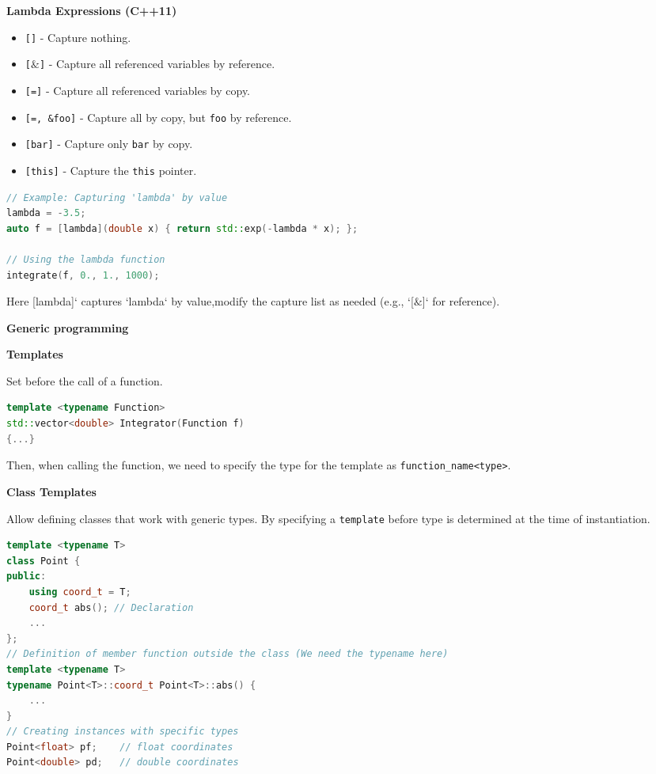 \documentclass[fontsize=8pt, a4paper, landscape, fleqn]{scrartcl}
\renewcommand{\section}[1]{%
    \noindent\colorbox{sectioncolor}{%
        \parbox{\dimexpr\columnwidth-2\fboxsep}{\color{white}\textbf{#1}}}%
    \vspace{0.5mm}%
}
\renewcommand{\subsection}[1]{%
    \noindent\colorbox{subsectioncolor}{%
        \parbox{\dimexpr\columnwidth-2\fboxsep}{\color{white}\textbf{#1}}}%
    \vspace{0.5mm}%
}
\begin{document}
\begin{multicols*}{3}[\raggedcolumns]
\subsection{Lambda Expressions (C++11)}
\begin{itemize}
    \item \texttt{[]} - Capture nothing.
    \item \texttt{[$\&$]} - Capture all referenced variables by reference.
    \item \texttt{[=]} - Capture all referenced variables by copy.
    \item \texttt{[=, \&foo]} - Capture all by copy, but \texttt{foo} by reference.
    \item \texttt{[bar]} - Capture only \texttt{bar} by copy.
    \item \texttt{[this]} - Capture the \texttt{this} pointer.
\end{itemize}

\begin{lstlisting}[language=C++, breaklines, emph={operator}, emphstyle={\color{red}}]
// Example: Capturing 'lambda' by value
lambda = -3.5;
auto f = [lambda](double x) { return std::exp(-lambda * x); };

// Using the lambda function
integrate(f, 0., 1., 1000);
\end{lstlisting}
Here [lambda]` captures `lambda` by value,modify the capture list as needed (e.g., `[$\&$]` for reference).
    \section{Generic programming}
    \subsection{Templates} 
    Set before the call of a function.

    \begin{lstlisting}[language=C++, breaklines, emph={template, Function}, emphstyle={\color{red}}]
template <typename Function>
std::vector<double> Integrator(Function f)
{...}\end{lstlisting}


    Then, when calling the function, we need to specify the type for the template as \lstinline{function_name<type>}.

    \subsection{Class Templates} 
Allow defining classes that work with generic types. By specifying a \texttt{template} before type is determined at the time of instantiation. 
\begin{lstlisting}[language=C++, breaklines, emph={T}, emphstyle={\color{red}}]
template <typename T>
class Point {
public:
    using coord_t = T;
    coord_t abs(); // Declaration
    ...
};
// Definition of member function outside the class (We need the typename here)
template <typename T>
typename Point<T>::coord_t Point<T>::abs() {
    ...
}
// Creating instances with specific types
Point<float> pf;    // float coordinates
Point<double> pd;   // double coordinates
\end{lstlisting}

\end{multicols*}
\end{document}
